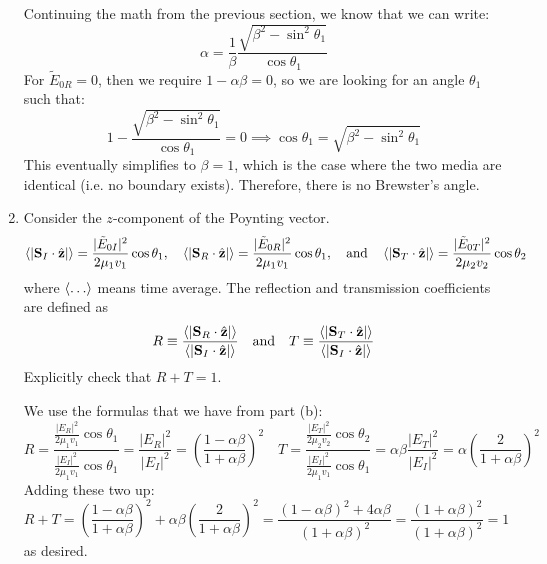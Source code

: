 \documentclass[10pt]{article}
\begin{document}
\begin{enumerate}[label=(\alph*)]
			\begin{solution}
				Continuing the math from the previous section, we know that we can write:
				\[
					\alpha = \frac{1}{\beta}\frac{\sqrt{\beta^2 - \sin^2 \theta_1}}{\cos \theta_1}
				\]
				For \( \tilde E_{0R} = 0 \), then we require \( 1 -\alpha \beta = 0 \), so we are looking for 
				an angle \( \theta_1 \) such that:
				\[
					1 - \frac{\sqrt{\beta^2 - \sin^2 \theta_1}}{\cos \theta_1} = 0 \implies \cos \theta_1
					= \sqrt{\beta^2 - \sin^2 \theta_1}
				\]
				This eventually simplifies to \( \beta = 1 \), which is the case where the two media are
				identical (i.e. no boundary exists). Therefore, there is no Brewster's angle. 
			\end{solution}
		\item Consider the \( z \)-component of the Poynting vector.
			\[
				\left\langle |\mathbf{S}_I \cdot \hat{\mathbf{z}}| \right\rangle = \frac{|\tilde E_{0I}|^2}{2\mu_1v_1}\cos
				\theta_1, \quad \left\langle |\mathbf{S}_R \cdot \hat{\mathbf{z}}| \right\rangle = \frac{|\tilde
				E_{0R}|^2}{2\mu_1v_1} \cos \theta_1, \quad \text{and} \quad \left\langle |\mathbf{S}_T \cdot
			\hat{\mathbf{z}}| \right\rangle = \frac{|\tilde E_{0T}|^2}{2 \mu_2v_2}\cos \theta_2
			\]
			where \( \mean{\dots} \) means time average. The reflection and transmission coefficients are
			defined as
			\[
				R\equiv \frac{\left\langle |\mathbf{S}_R \cdot \hat{\mathbf{z}}| \right\rangle}{\left\langle |\mathbf{S}_I \cdot
				\hat{\mathbf{z}}| \right\rangle} \quad \text{and} \quad T\equiv \frac{\left\langle |\mathbf{S}_T \cdot
				\hat{\mathbf{z}}| \right\rangle}{\left\langle |\mathbf{S}_I \cdot \hat{\mathbf{z}}| \right\rangle}
			\]
			Explicitly check that \( R +T = 1 \). 

			\begin{solution}
				We use the formulas that we have from part (b):
				\[
					R = \frac{\frac{|E_R|^2}{2 \mu_1v_1}\cos \theta_1}{\frac{|E_I|^2}{2 \mu_1v_1}\cos
					\theta_1} = \frac{|E_R|^2}{|E_I|^2} = \left( \frac{1 - \alpha \beta}{1 + \alpha \beta}
					\right)^2
					\quad
					T = \frac{\frac{|E_T|^2}{2 \mu_2v_2} \cos \theta_2}{\frac{|E_I|^2}{2 \mu_1v_1}\cos
					\theta_1} = \alpha \beta \frac{|E_T|^2}{|E_I|^2} = \alpha \left( \frac{2}{1 + \alpha
					\beta} \right)^2
				\]
				Adding these two up:
				\[
					 R + T = \left( \frac{1 - \alpha \beta}{1 + \alpha \beta} \right)^2 + \alpha \beta \left(
					 \frac{2}{1 + \alpha \beta}\right)^2 = \frac{(1 - \alpha \beta)^2 + 4 \alpha \beta}{(1 +
				 \alpha \beta)^2} = \frac{(1 + \alpha \beta)^2}{(1 + \alpha \beta)^2} = 1
				\]
				as desired. 
			\end{solution}
	\end{enumerate}
\end{document}
